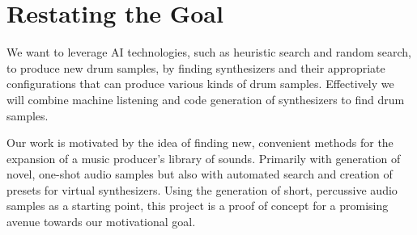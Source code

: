\documentclass[\main/thesis.tex]{subfiles}
\begin{document}


\section{Restating the Goal}
We want to leverage AI technologies, such as heuristic search and random search, to produce new drum samples, by finding synthesizers and their appropriate configurations that can produce various kinds of drum samples. Effectively we will combine machine listening and code generation of synthesizers to find drum samples.

Our work is motivated by the idea of finding new, convenient methods for the expansion of a music producer's library of sounds. Primarily with generation of novel, one-shot audio samples but also with automated search and creation of presets for virtual synthesizers. Using the generation of short, percussive audio samples as a starting point, this project is a proof of concept for a promising avenue towards our motivational goal.
\end{document}
